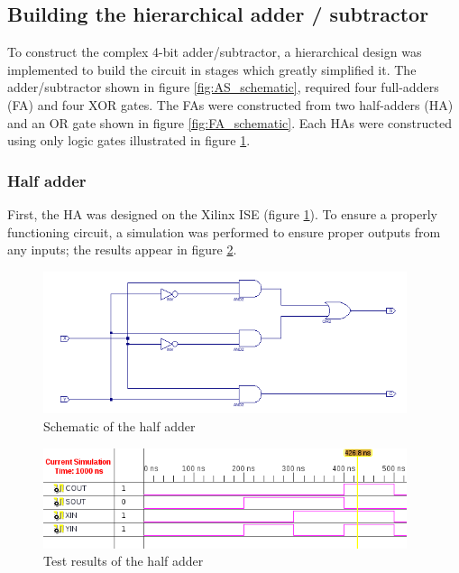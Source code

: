 \documentclass[11pt]{article}
\begin{document}
\subsection{Building the hierarchical adder / subtractor}

To construct the complex 4-bit adder/subtractor, a hierarchical design was implemented to build the circuit in stages which greatly simplified it. The adder/subtractor shown in figure \ref{fig:AS_schematic}, required four full-adders (FA) and four XOR gates. The FAs were constructed from two half-adders (HA) and an OR gate shown in figure \ref{fig:FA_schematic}. Each HAs were constructed using only logic gates illustrated in figure \ref{fig:HA_schematic}.

\subsubsection{Half adder}

First, the HA was designed on the Xilinx ISE (figure \ref{fig:HA_schematic}). To ensure a properly functioning circuit, a simulation was performed to ensure proper outputs from any inputs; the results appear in figure \ref{fig:HA_test}.

\begin{figure}[htpb]
	\centering
	\includegraphics[width=0.95\textwidth]{HA-schematic}
	\caption{Schematic of the half adder}
	\label{fig:HA_schematic}
\end{figure}

\begin{figure}[htpb]
	\centering
	\includegraphics[width=0.95\textwidth]{HA_test}
	\caption{Test results of the half adder}
	\label{fig:HA_test}
\end{figure}
\end{document}
